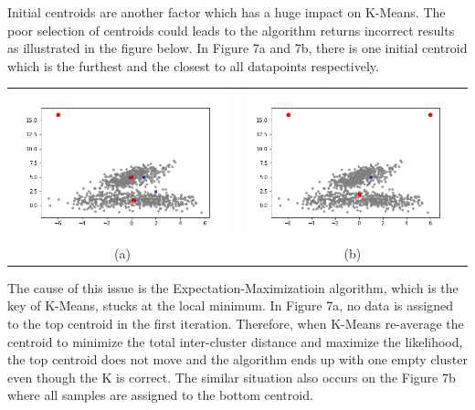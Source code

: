 \documentclass{article}
\begin{document}
Initial centroids are another factor which has a huge impact on K-Means. The poor selection of centroids could leads to the algorithm returns incorrect results as illustrated in the figure below. In Figure 7a and 7b, there is one initial centroid which is the furthest and the closest to all datapoints respectively.\\

\begin{center}
\begin{tabular}{c c}
\includegraphics[scale=0.3]{one_furthest_centroid} &
\includegraphics[scale=0.3]{one_nearest_centroid} \\
\scriptsize (a) & \scriptsize (b)
\end{tabular}
\end{center}

The cause of this issue is the Expectation-Maximizatioin algorithm, which is the key of K-Means, stucks at the local minimum. In Figure 7a, no data is assigned to the top centroid in the first iteration. Therefore, when K-Means re-average the centroid to minimize the total inter-cluster distance and maximize the likelihood, the top centroid does not move and the algorithm ends up with one empty cluster even though the K is correct. The similar situation also occurs on the Figure 7b where all samples are assigned to the bottom centroid.
\end{document}
